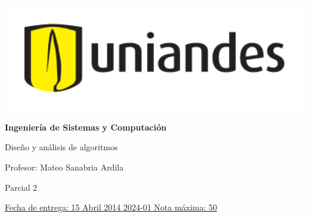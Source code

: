 \documentclass[12pt, a4paper]{exam}
\begin{document}
	\noindent
	\begin{minipage}[l]{0.1\textwidth}
		\noindent
		\includegraphics[width=1.8\textwidth]{Logosimbolo-uniandes_horizontal.png}
	\end{minipage}
\hfill
\begin{minipage}[c]{0.8\textwidth}
	\begin{center}
		{\large \textbf{Ingeniería de Sistemas y Computación} \par
		\large	Diseño y análisis de algoritmos	\par
		\small  Profesor: Mateo Sanabria Ardila	\par
		\small  Parcial 2	\par
		}
	\end{center}
\end{minipage}
\par
\vspace{0.2in}
\noindent
\uline{Fecha de entrega: 15 Abril 2014	\hfill  2024-01		\hfill Nota máxima: 50}
\par 
\vspace{0.15in}
\end{document}

